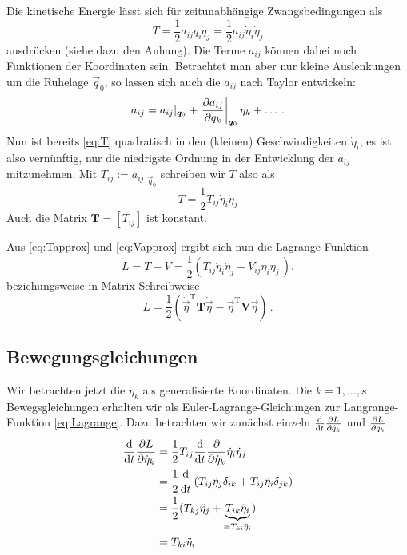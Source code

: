 \documentclass[paper=a4, fontsize=11.0pt, abstractoff, DIV12]{scrartcl}
\begin{document}
Die kinetische Energie lässt sich für zeitunabhängige Zwangsbedingungen als
\begin{equation}
T = \frac{1}{2} a_{ij} \dot{q}_i \dot{q}_j = \frac{1}{2} a_{ij} \dot{\eta}_i \dot{\eta}_j
\label{eq:T}
\end{equation}
ausdrücken (siehe dazu den Anhang). Die Terme $a_{ij}$ können dabei noch
Funktionen der Koordinaten sein. Betrachtet man aber nur kleine Auslenkungen um
die Ruhelage $\vec{q}_0$, so lassen sich auch die $a_{ij}$ nach Taylor entwickeln:
\begin{equation}
a_{ij} = a_{ij}\vert_{{\boldsymbol{q}}_0} + \left.\frac{\partial a_{ij}}{\partial q_k}\right|_{{\boldsymbol{q}}_0} \eta_k + \dots\, .
\end{equation}
Nun ist bereits \eqref{eq:T} quadratisch in den (kleinen) Geschwindigkeiten
$\dot{\eta}_i$, es ist also vernünftig, nur die niedrigste Ordnung in der
Entwicklung der $a_{ij}$ mitzunehmen. Mit $T_{ij} := a_{ij}\vert_{\vec{q}_0}$
schreiben wir $T$ also als
\begin{equation}
T = \frac{1}{2} T_{ij}\dot{\eta}_i\dot{\eta}_j
\label{eq:Tapprox}
\end{equation}
Auch die Matrix $\mathbf T = \left[T_{ij} \right]$ ist konstant.

Aus \eqref{eq:Tapprox} und \eqref{eq:Vapprox} ergibt sich nun die
Lagrange-Funktion
\begin{equation}
L = T-V= \frac{1}{2}\left(T_{ij} \dot{\eta}_i\dot{\eta}_j - V_{ij}\eta_i\eta_j\,\right) .
\label{eq:Lagrange}
\end{equation}
beziehungsweise in Matrix-Schreibweise
\begin{equation}
L = \frac{1}{2}\left(\dot{\vec{\eta}}^\mathrm{T}\mathbf{T}\dot{\vec{\eta}} - \vec{\eta}^\mathrm{T}\mathbf{V}\vec{\eta}\right)\,.
\label{eq:MatrixLagrange}
\end{equation}

\subsection{Bewegungsgleichungen}

Wir betrachten jetzt die $\eta_k$ als generalisierte Koordinaten. Die
$k=1, \dots, s$ Bewegsgleichungen erhalten wir als Euler-Lagrange-Gleichungen
zur Langrange-Funktion \eqref{eq:Lagrange}. Dazu betrachten wir zunächst einzeln
$\frac{\mathrm{d}}{\mathrm{d}t}\frac{\partial L}{\partial \dot{q}_{k}}$ und $\frac{\partial L}{\partial q_k}$:
\begin{align}
\frac{\mathrm{d}}{\mathrm{d}t}\frac{\partial L}{\partial \dot{\eta}_k} &= \frac{1}{2}T_{ij}\frac{\mathrm{d}}{\mathrm{d}t} \frac{\partial }{\partial \dot{\eta}_k} \dot{\eta}_i \dot{\eta}_j\nonumber\\
&= \frac{1}{2}\frac{\mathrm{d}}{\mathrm{d}t} \left(T_{ij} \dot{\eta}_j\delta_{ik} + T_{ij}\dot{\eta}_i\delta_{jk} \right)\nonumber\\
&= \frac{1}{2}(T_{kj}\ddot{\eta}_j + \underbrace{T_{ik}\ddot{\eta}_i}_{=T_{ki}\ddot{\eta}_i})\nonumber\\
&= T_{ki} \ddot{\eta}_i
\label{eq:LGT}
\end{align}
\end{document}
